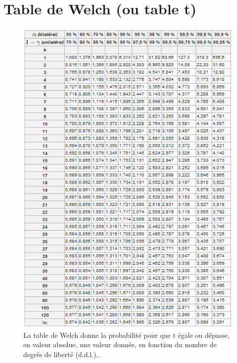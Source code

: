 \documentclass[10pt, oneside, a4paper]{article}
\begin{document}
\appendix
\clearpage
\section{Table de Welch (ou table t)}
\begin{figure}[!ht]
    \includegraphics[width=\linewidth]{image/table_t}
    \caption{La table de Welch donne la probabilité {\alpha} pour que t égale ou dépasse, en valeur absolue, une valeur donnée, en fonction du nombre de degrés de liberté (d.d.l.)..}
    \label{ann:table_t}
\end{figure}
\end{document}
